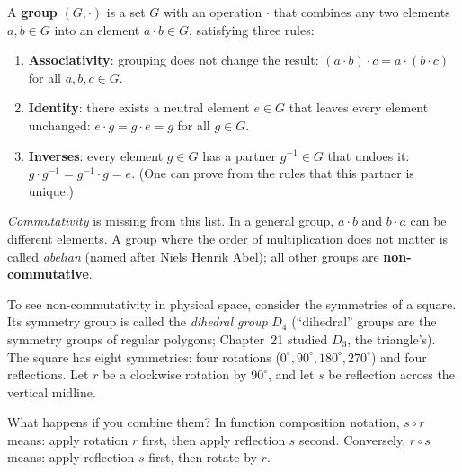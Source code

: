 A \textbf{group} $(G, \cdot)$ is a set $G$ with an operation $\cdot$ that combines any two elements $a, b \in G$ into an element $a \cdot b \in G$, satisfying three rules:
\begin{enumerate}
  \item \textbf{Associativity}: grouping does not change the result: $(a \cdot b) \cdot c = a \cdot (b \cdot c)$ for all $a, b, c \in G$.
  \item \textbf{Identity}: there exists a neutral element $e \in G$ that leaves every element unchanged: $e \cdot g = g \cdot e = g$ for all $g \in G$.
  \item \textbf{Inverses}: every element $g \in G$ has a partner $g^{-1} \in G$ that undoes it: $g \cdot g^{-1} = g^{-1} \cdot g = e$. (One can prove from the rules that this partner is unique.)
\end{enumerate}

\emph{Commutativity} is missing from this list. In a general group, $a \cdot b$ and $b \cdot a$ can be different elements. A group where the order of multiplication does not matter is called \emph{abelian} (named after Niels Henrik Abel); all other groups are \textbf{non-commutative}.

To see non-commutativity in physical space, consider the symmetries of a square. Its symmetry group is called the \emph{dihedral group} $D_4$ (``dihedral'' groups are the symmetry groups of regular polygons; Chapter~21 studied $D_3$, the triangle's). The square has eight symmetries: four rotations ($0^\circ, 90^\circ, 180^\circ, 270^\circ$) and four reflections. Let $r$ be a clockwise rotation by $90^\circ$, and let $s$ be reflection across the vertical midline.

What happens if you combine them? In function composition notation, $s \circ r$ means: apply rotation $r$ first, then apply reflection $s$ second. Conversely, $r \circ s$ means: apply reflection $s$ first, then rotate by $r$.

